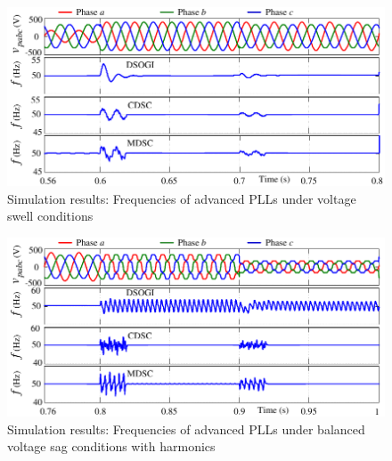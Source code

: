 \begin{figure}[h] 
	\centering
	\includegraphics[scale=1]{figures/Chapter_3/Mine/SimRes3_new.pdf}
	\caption{Simulation results: Frequencies of advanced PLLs under voltage swell conditions}
	\label{fig3.9(3)}
\end{figure}
\begin{figure}[h] 
	\centering
	\includegraphics[scale=1]{figures/Chapter_3/Mine/SimRes4_new.pdf}
	\caption{Simulation results: Frequencies of advanced PLLs under balanced voltage sag conditions with harmonics}
	\label{fig3.9(4)}
\end{figure}
